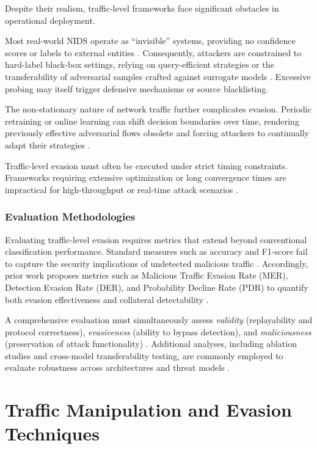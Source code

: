 Despite their realism, traffic-level frameworks face significant obstacles in operational deployment.

Most real-world NIDS operate as ``invisible'' systems, providing no confidence scores or labels to external entities \cite{vitorino2023sok}. 
Consequently, attackers are constrained to hard-label black-box settings, relying on query-efficient strategies or the transferability of adversarial samples crafted against surrogate models \cite{liu2025hard}. 
Excessive probing may itself trigger defensive mechanisms or source blacklisting.

The non-stationary nature of network traffic further complicates evasion. Periodic retraining or online learning can shift decision boundaries over time, rendering previously effective adversarial flows obsolete and forcing attackers to continually adapt their strategies \cite{apruzzese2024adversarial}.

Traffic-level evasion must often be executed under strict timing constraints. 
Frameworks requiring extensive optimization or long convergence times are impractical for high-throughput or real-time attack scenarios \cite{liu2025hard}.

\subsubsection{Evaluation Methodologies}

Evaluating traffic-level evasion requires metrics that extend beyond conventional classification performance. 
Standard measures such as accuracy and F1-score fail to capture the security implications of undetected malicious traffic \cite{han2021evaluating}. 
Accordingly, prior work proposes metrics such as Malicious Traffic Evasion Rate (MER), Detection Evasion Rate (DER), and Probability Decline Rate (PDR) to quantify both evasion effectiveness and collateral detectability \cite{han2021evaluating}. 

A comprehensive evaluation must simultaneously assess \emph{validity} (replayability and protocol correctness), \emph{evasiveness} (ability to bypass detection), and \emph{maliciousness} (preservation of attack functionality) \cite{he2023adversarial}. 
Additional analyses, including ablation studies and cross-model transferability testing, are commonly employed to evaluate robustness across architectures and threat models \cite{debicha2023adv}.


\section{Traffic Manipulation and Evasion Techniques}


